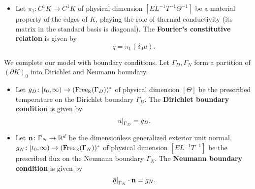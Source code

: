 \begin{discussion}
\begin{itemize}
    \item
      Let $\pi_1 \colon C^1 K \to C^1 K$
      of physical dimension $[E L^{-1} T^{-1} \Theta^{-1}]$
      be a material property of the edges of $K$,
      playing the role of thermal conductivity
      (its matrix in the standard basis is diagonal).
      The \textbf{Fourier's constitutive relation} is given by
      \begin{equation}
        q = \pi_1 (\delta_0 u).
      \end{equation}
  \end{itemize}
  We complete our model with boundary conditions.
  Let $\Gamma_D, \Gamma_N$ form a partition of $(\partial K)_0$
  into Dirichlet and Neumann boundary.
  \begin{itemize}
    \item
      Let $g_D \colon [t_0, \infty) \to ({\rm Free}_{\mathbb{R}}(\Gamma_D))^*$
      of physical dimension $[\Theta]$
      be the prescribed temperature on the Dirichlet boundary $\Gamma_D$.
      The \textbf{Dirichlet boundary condition} is given by
      \begin{equation}
        \left. u \right|_{\Gamma_D} = g_D.
      \end{equation}
    \item
      Let
        ${\bf n} \colon \Gamma_N \to \mathbb{R}^d$
          be the dimensionless generalized exterior unit normal,
        $g_N \colon [t_0, \infty) \to ({\rm Free}_{\mathbb{R}}(\Gamma_N))^*$
          of physical dimension $[E L^{-1} T^{-1}]$
          be the prescribed flux on the Neumann boundary $\Gamma_N$.
      The \textbf{Neumann boundary condition} is given by
      \begin{equation}
        \left. \overline{q} \right|_{\Gamma_N} \cdot {\bf n} = g_N.
      \end{equation}
  \end{itemize}
\end{discussion}
